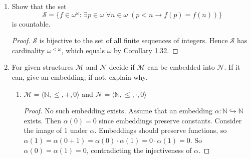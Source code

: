 \documentclass{article}
\begin{document}
\begin{enumerate}
    \begin{proof}
      $\mathcal{S}$ is the set of monotonically increasing countable
      sequences of integers. Since $\mathcal{S}$ is a subset of
      $\omega^\omega$ which has cardinality $|2^\omega|$ from Corollary
      1.31, the cardinality of $\mathcal{S}$ must be smaller or equal to
      $|2^\omega|$. Hence it remains to show that $|\mathcal{S}|>\omega$.
      To prove that, it suffices to show that $\omega$ cannot enumerate
      $\mathcal{S}$. We prove this by using Cantor's diagonal argument.
      Assume that $\{f_i\}_{i\in\omega}$ enumerates $\mathcal{S}$. We
      inductively construct a new monotonically increasing function $f$
      that does not belong to any $f_i$'s, as follows: Set $f(0)=f_0(0)+1$.
      For each $n\in\omega$, set $f(n+1)=\max(f(n),f_n(n))+1$. By
      construction, $f$ cannot equal to any of the $f_i$'s in $\mathcal{S}$
      because $f(i)>f_i(i)$. Hence no countable enumeration of
      $\mathcal{S}$ exists.
    \end{proof}

  \item Show that the set
    \begin{equation*}
      \mathcal{S}=\{f\in\omega^\omega:\, \exists p\in\omega\; \forall
      n\in\omega\; (p<n\rightarrow f(p)=f(n))\}
    \end{equation*}
    is countable.

    \begin{proof}
      $\mathcal{S}$ is bijective to the set of all finite sequences of
      integers. Hence $\mathcal{S}$ has cardinality $\omega^{<\omega}$,
      which equals $\omega$ by Corollary 1.32.
    \end{proof}

  \item For given structures $\mathscr{M}$ and $\mathscr{N}$ decide if
    $\mathscr{M}$ can be embedded into $\mathscr{N}$. If it can, give an
    embedding; if not, explain why.

    \begin{enumerate}
      \item $\mathscr{M}=\langle\mathbb{N},\leq,+,0\rangle$ and
        $\mathscr{N}=\langle\mathbb{N},\leq,\cdot,0\rangle$
        \begin{proof}
          No such embedding exists. Assume that an embedding
          $\alpha:\mathbb{N}\hookrightarrow\mathbb{N}$ exists. Then
          $\alpha(0)=0$ since embeddings preserve constants. Consider the
          image of $1$ under $\alpha$. Embeddings should preserve
          functions, so
          $\alpha(1)=\alpha(0+1)=\alpha(0)\cdot\alpha(1)=0\cdot\alpha(1)=0$.
          So $\alpha(0)=\alpha(1)=0$, contradicting the injectiveness of
          $\alpha$.
        \end{proof}


\end{enumerate}
\end{enumerate}
\end{document}
